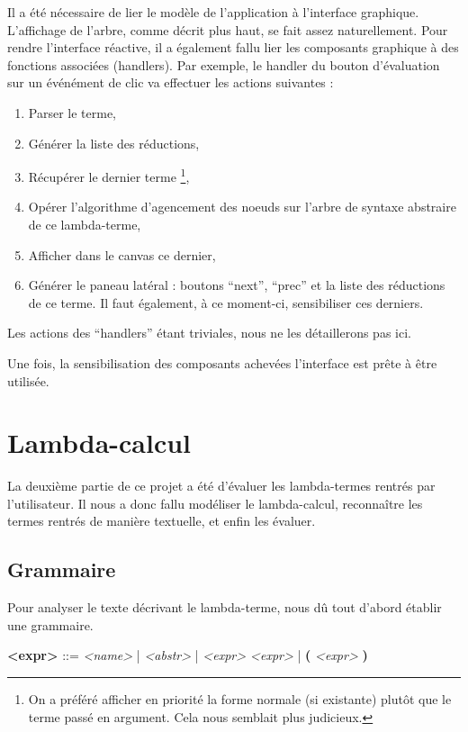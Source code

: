 \documentclass[11pt,a4paper]{report}
\begin{document}
Il a été nécessaire de lier le modèle de l'application à l'interface
graphique. L'affichage de l'arbre, comme décrit plus haut, se fait
assez naturellement. Pour rendre l'interface réactive, il a également
fallu lier les composants graphique à des fonctions associées
(handlers). Par exemple, le handler du bouton d'évaluation sur un
événément de clic va effectuer les actions suivantes :
\begin{enumerate}
\item Parser le terme,
\item Générer la liste des réductions,
\item Récupérer le dernier terme \footnote{On a préféré afficher en
  priorité la forme normale (si existante) plutôt que le terme passé
  en argument. Cela nous semblait plus judicieux.},
\item Opérer l'algorithme d'agencement des noeuds sur l'arbre de
  syntaxe abstraire de ce lambda-terme,
\item Afficher dans le canvas ce dernier,
\item Générer le paneau latéral : boutons ``next'', ``prec'' et la
  liste des réductions de ce terme. Il faut également, à ce moment-ci,
  sensibiliser ces derniers.
\end{enumerate}
Les actions des ``handlers'' étant triviales, nous ne les détaillerons
pas ici.

Une fois, la sensibilisation des composants achevées l'interface est
prête à être utilisée.


\chapter{Lambda-calcul}

La deuxième partie de ce projet a été d'évaluer les lambda-termes rentrés par l'utilisateur. Il nous a donc fallu modéliser le lambda-calcul, reconnaître les termes rentrés de manière textuelle, et enfin les évaluer.

\section{Grammaire}
\bigskip
Pour analyser le texte décrivant le lambda-terme, nous dû tout d'abord établir une grammaire.

\medskip

\textbf{<expr>}  ::=  \textit{<name>}
           | \textit{<abstr>}
           | \textit{<expr> <expr>}
           | \textbf{(} \textit{<expr>} \textbf{)}
\end{document}
